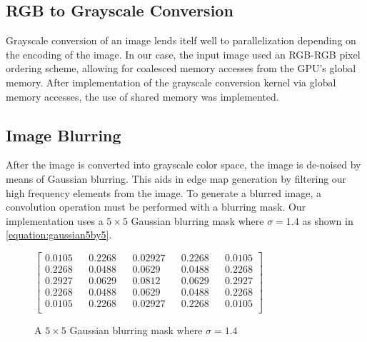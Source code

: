 \documentclass[conference]{IEEEtran}
\begin{document}
\subsection{RGB to Grayscale Conversion}
Grayscale conversion of an image lends itelf well to parallelization depending on the encoding of the image.
In our case, the input image used an RGB-RGB pixel ordering scheme, allowing for coalesced memory accesses from the GPU's global memory.
After implementation of the grayscale conversion kernel via global memory accesses, the use of shared memory was implemented.






\subsection{Image Blurring}
After the image is converted into grayscale color space, the image is de-noised by means of Gaussian blurring.
This aids in edge map generation by filtering our high frequency elements from the image.
To generate a blurred image, a convolution operation must be performed with a blurring mask. 
Our implementation uses a $5 \times 5$ Gaussian blurring mask where $\sigma = 1.4$ as shown in \autoref{equation:gaussian5by5}.


\begin{figure}[h] %
$\begin{bmatrix}
  0.0105 && 0.2268 && 0.02927 && 0.2268 && 0.0105 \\
  0.2268 && 0.0488 && 0.0629 && 0.0488 && 0.2268 \\
  0.2927 && 0.0629 && 0.0812 && 0.0629 && 0.2927 \\
  0.2268 && 0.0488 && 0.0629 && 0.0488 && 0.2268 \\
  0.0105 && 0.2268 && 0.02927 && 0.2268 && 0.0105 \\
\end{bmatrix}$\caption{A $5 \times 5$ Gaussian blurring mask where $\sigma = 1.4$}\label{equation:gaussian5by5}
\end{figure}
\end{document}
